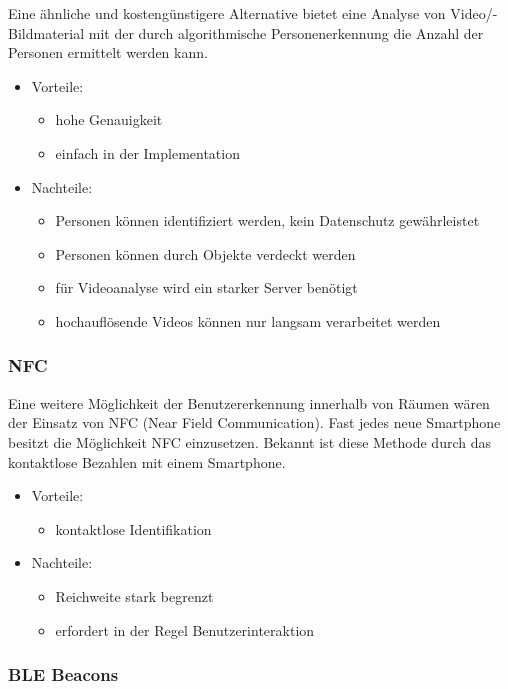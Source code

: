 Eine ähnliche und kostengünstigere Alternative bietet eine Analyse von
Video/- \bzw Bildmaterial mit der durch algorithmische Personenerkennung die
Anzahl der Personen ermittelt werden kann.

\begin{itemize}
	\item Vorteile:
	\begin{itemize}
		\item hohe Genauigkeit
		\item einfach in der Implementation
	\end{itemize}
	\item Nachteile:
	\begin{itemize}
		\item Personen können identifiziert werden, kein Datenschutz gewährleistet
		\item Personen können durch Objekte verdeckt werden
		\item für Videoanalyse wird ein starker Server benötigt
		\item hochauflösende Videos können nur langsam verarbeitet werden
	\end{itemize}
\end{itemize}


\subsubsection{NFC}
\label{sec:NFC}

Eine weitere Möglichkeit der Benutzererkennung innerhalb von Räumen wären der
Einsatz von NFC (Near Field Communication). 
Fast jedes neue Smartphone besitzt die Möglichkeit NFC einzusetzen. Bekannt ist
diese Methode \zB durch das kontaktlose Bezahlen mit einem Smartphone.

\begin{itemize}
	\item Vorteile:
	\begin{itemize}
		\item kontaktlose Identifikation
	\end{itemize}
	\item Nachteile:
	\begin{itemize}
		\item Reichweite stark begrenzt
		\item erfordert in der Regel Benutzerinteraktion
	\end{itemize}
\end{itemize}


\subsubsection{BLE Beacons}
\label{sec:BLE Beacons}


